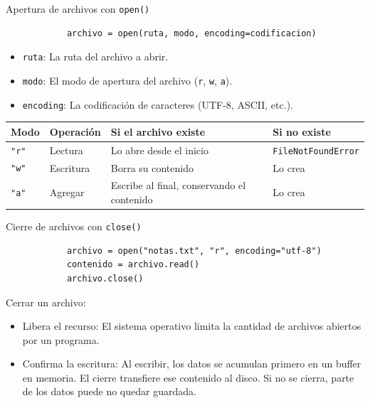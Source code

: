 \documentclass{beamer}
\begin{document}
    \begin{frame}[fragile, t]{Apertura de archivos con \texttt{open()}}
        \begin{verbatim}
            archivo = open(ruta, modo, encoding=codificacion)
        \end{verbatim}
        \begin{itemize}
            \item \texttt{ruta}: La ruta del archivo a abrir.
            \item \texttt{modo}: El modo de apertura del archivo (\texttt{r}, \texttt{w}, \texttt{a}).
            \item \texttt{encoding}: La codificación de caracteres (UTF-8, ASCII, etc.).
        \end{itemize}
        \renewcommand{\arraystretch}{1.4}
        \begin{center}
            \footnotesize
            \begin{tabular}{@{}p{1cm}p{1.5cm}p{3.5cm}p{3.5cm}@{}}
                \toprule
                \textbf{Modo} & \textbf{Operación} & \textbf{Si el archivo existe} & \textbf{Si no existe} \\
                \midrule
                \texttt{"r"} &
                Lectura &
                Lo abre desde el inicio &
                \texttt{FileNotFoundError} \\
                \texttt{"w"} &
                Escritura &
                Borra su contenido &
                Lo crea \\
                \texttt{"a"} &
                Agregar &
                Escribe al final, conservando el contenido &
                Lo crea \\
                \bottomrule
            \end{tabular}
        \end{center}
    \end{frame}

    \begin{frame}[fragile, t]{Cierre de archivos con \texttt{close()}}
        \begin{verbatim}
            archivo = open("notas.txt", "r", encoding="utf-8")
            contenido = archivo.read()
            archivo.close()
        \end{verbatim}
        Cerrar un archivo:
        \begin{itemize}
            \item Libera el recurso: El sistema operativo limita la cantidad de archivos abiertos por un programa.
            \item Confirma la escritura: Al escribir, los datos se acumulan primero en un buffer en memoria. 
            El cierre transfiere ese contenido al disco. Si no se cierra, parte de los datos puede no quedar guardada.
        \end{itemize}
    \end{frame}
\end{document}
